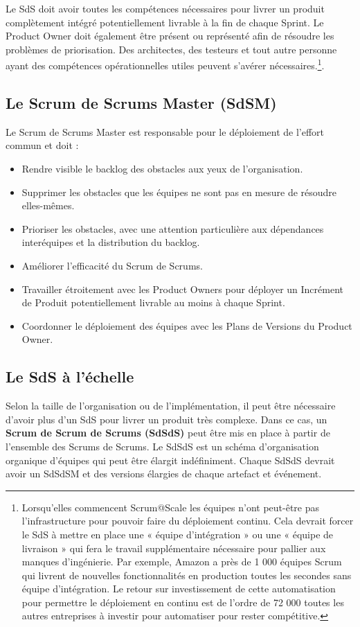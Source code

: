 \documentclass[12pt,a4paper,parskip=full]{scrartcl}
\begin{document}
Le SdS doit avoir toutes les compétences nécessaires pour livrer un produit complètement
intégré potentiellement livrable à la fin de chaque Sprint. Le Product Owner doit également
être présent ou représenté afin de résoudre les problèmes de priorisation. Des architectes,
des testeurs et tout autre personne ayant des compétences opérationnelles utiles peuvent
s’avérer nécessaires.\footnote{Lorsqu’elles commencent Scrum@Scale les équipes n’ont peut-être pas
l’infrastructure pour pouvoir faire du déploiement continu. Cela devrait forcer le SdS à
mettre en place une « équipe d’intégration » ou une « équipe de livraison » qui fera le
travail supplémentaire nécessaire pour pallier aux manques d’ingénierie. Par exemple,
Amazon a près de 1 000 équipes Scrum qui livrent de nouvelles fonctionnalités en
production toutes les secondes sans équipe d’intégration. Le retour sur investissement
de cette automatisation pour permettre le déploiement en continu est de l’ordre de 72
000 %
toutes les autres entreprises à investir pour automatiser pour rester compétitive.}.

\subsection{Le Scrum de Scrums Master (SdSM)}
Le Scrum de Scrums Master est responsable pour le déploiement de l’effort commun et
doit :
\begin{itemize}
\item Rendre visible le backlog des obstacles aux yeux de l’organisation.
\item Supprimer les obstacles que les équipes ne sont pas en mesure de résoudre
elles-mêmes.
\item Prioriser les obstacles, avec une attention particulière aux dépendances interéquipes
et la distribution du backlog.
\item Améliorer l’efficacité du Scrum de Scrums.
\item Travailler étroitement avec les Product Owners pour déployer un Incrément de
Produit potentiellement livrable au moins à chaque Sprint.
\item Coordonner le déploiement des équipes avec les Plans de Versions du Product
Owner.
\end{itemize}

\subsection{Le SdS à l’échelle}
Selon la taille de l’organisation ou de l’implémentation, il peut être nécessaire d’avoir plus
d’un SdS pour livrer un produit très complexe. Dans ce cas, un \textbf{Scrum de Scrum de
Scrums (SdSdS)} peut être mis en place à partir de l’ensemble des Scrums de Scrums. Le
SdSdS est un schéma d’organisation organique d’équipes qui peut être élargit
indéfiniment. Chaque SdSdS devrait avoir un SdSdSM et des versions élargies de chaque
artefact et événement.
\end{document}
